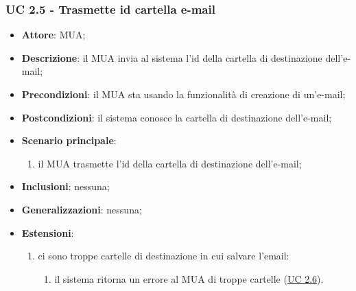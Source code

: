     \subsubsection{UC 2.5 - Trasmette id cartella e-mail} \label{sec:UC2.5}
    \begin{itemize}
        \item \textbf{Attore}: MUA;
        \item \textbf{Descrizione}: il MUA invia al sistema l'id della cartella di destinazione dell'e-mail;
        \item \textbf{Precondizioni}: il MUA sta usando la funzionalità di creazione di un'e-mail;
        \item \textbf{Postcondizioni}: il sistema conosce la cartella di destinazione dell'e-mail;
        \item \textbf{Scenario principale}:
            \begin{enumerate}
                \item il MUA trasmette l'id della cartella di destinazione dell'e-mail;
            \end{enumerate}
        \item \textbf{Inclusioni}: nessuna;
        \item \textbf{Generalizzazioni}: nessuna;
        \item \textbf{Estensioni}:             
        \begin{enumerate}[label=\alph*.]
            \item ci sono troppe cartelle di destinazione in cui salvare l'email:
            \begin{enumerate}[label=\arabic*.]
                \item il sistema ritorna un errore al MUA di troppe cartelle (\hyperref[sec:UC2.6]{UC 2.6}).
            \end{enumerate}
        \end{enumerate}
    \end{itemize}

